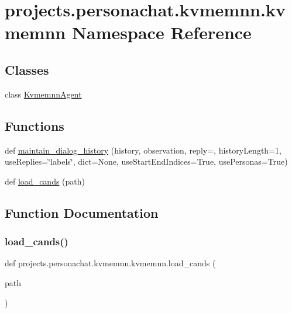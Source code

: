 \hypertarget{namespaceprojects_1_1personachat_1_1kvmemnn_1_1kvmemnn}{}\section{projects.\+personachat.\+kvmemnn.\+kvmemnn Namespace Reference}
\label{namespaceprojects_1_1personachat_1_1kvmemnn_1_1kvmemnn}
\subsection*{Classes}
\begin{DoxyCompactItemize}
\item 
class \hyperlink{classprojects_1_1personachat_1_1kvmemnn_1_1kvmemnn_1_1KvmemnnAgent}{Kvmemnn\+Agent}
\end{DoxyCompactItemize}
\subsection*{Functions}
\begin{DoxyCompactItemize}
\item 
def \hyperlink{namespaceprojects_1_1personachat_1_1kvmemnn_1_1kvmemnn_afe498b578d5df47bf521e2b38dd61605}{maintain\+\_\+dialog\+\_\+history} (history, observation, reply=\textquotesingle{}\textquotesingle{}, history\+Length=1, use\+Replies=\char`\"{}labels\char`\"{}, dict=None, use\+Start\+End\+Indices=True, use\+Personas=True)
\item 
def \hyperlink{namespaceprojects_1_1personachat_1_1kvmemnn_1_1kvmemnn_a7f44d8ff34857c26b87223a668c43724}{load\+\_\+cands} (path)
\end{DoxyCompactItemize}


\subsection{Function Documentation}
\mbox{\label{namespaceprojects_1_1personachat_1_1kvmemnn_1_1kvmemnn_a7f44d8ff34857c26b87223a668c43724}} 
\subsubsection{\texorpdfstring{load\+\_\+cands()}{load\_cands()}}
{\footnotesize\ttfamily def projects.\+personachat.\+kvmemnn.\+kvmemnn.\+load\+\_\+cands (\begin{DoxyParamCaption}\item[{}]{path }\end{DoxyParamCaption})}

